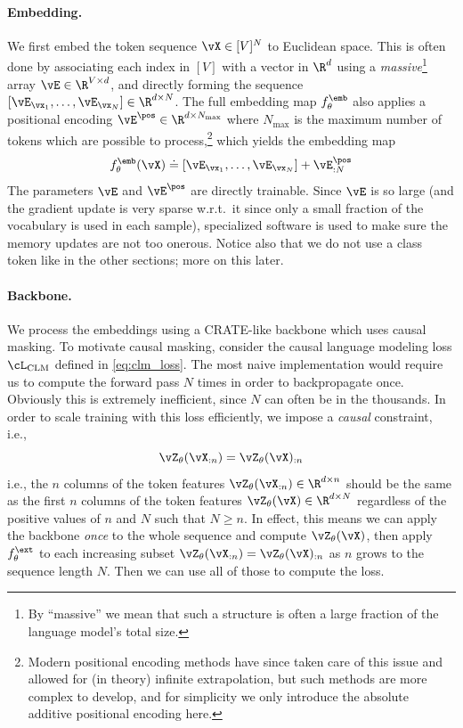 \documentclass[../../book-main.tex]{subfiles}
\begin{document}
\paragraph{Embedding.} We first embed the token sequence \(\vX \in [V]^{N}\) to Euclidean space. This is often done by associating each index in \([V]\) with a vector in \(\R^{d}\) using a \textit{massive}\footnote{By ``massive'' we mean that such a structure is often a large fraction of the language model's total size.} array \(\vE \in \R^{V \times d}\), and directly forming the sequence \([\vE_{\vx_{1}}, \dots, \vE_{\vx_{N}}] \in \R^{d \times N}\). The full embedding map \(f_{\theta}^{\emb}\) also applies a positional encoding \(\vE^{\pos} \in \R^{d  \times N_{\max}}\) where \(N_{\max}\) is the maximum number of tokens which are possible to process,\footnote{Modern positional encoding methods have since taken care of this issue and allowed for (in theory) infinite extrapolation, but such methods are more complex to develop, and for simplicity we only introduce the absolute additive positional encoding here.} which yields the embedding map 
\begin{equation}
    f_{\theta}^{\emb}(\vX) \doteq [\vE_{\vx_{1}}, \dots, \vE_{\vx_{N}}] + \vE_{:N}^{\pos}
\end{equation}
The parameters \(\vE\) and \(\vE^{\pos}\) are directly trainable. Since \(\vE\) is so large (and the gradient update is very sparse w.r.t.~it since only a small fraction of the vocabulary is used in each sample), specialized software is used to make sure the memory updates are not too onerous. Notice also that we do not use a class token like in the other sections; more on this later.

\paragraph{Backbone.} We process the embeddings using a CRATE-like backbone which uses causal masking. To motivate causal masking, consider the causal language modeling loss \(\cL_{\mathrm{CLM}}\) defined in \eqref{eq:clm_loss}. The most naive implementation would require us to compute the forward pass \(N\) times in order to backpropagate once. Obviously this is extremely inefficient, since \(N\) can often be in the thousands. In order to scale training with this loss efficiently, we impose a \textit{causal} constraint, i.e.,
\begin{equation}\label{eq:causal_backbone_def}
    \vZ_{\theta}(\vX_{:n}) = \vZ_{\theta}(\vX)_{:n}
\end{equation}
i.e., the \(n\) columns of the token features \(\vZ_{\theta}(\vX_{:n}) \in \R^{d \times n}\) should be the same as the first \(n\) columns of the token features \(\vZ_{\theta}(\vX) \in \R^{d \times N}\) regardless of the positive values of \(n\) and \(N\) such that \(N \geq n\). In effect, this means we can apply the backbone \textit{once} to the whole sequence and compute \(\vZ_{\theta}(\vX)\), then apply \(f_{\theta}^{\ext}\) to each increasing subset \(\vZ_{\theta}(\vX_{:n}) = \vZ_{\theta}(\vX)_{:n}\) as \(n\) grows to the sequence length \(N\). Then we can use all of those to compute the loss.
\end{document}
